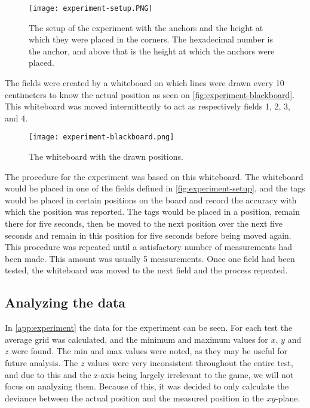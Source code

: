\begin{figure}[H]
    \centering
    \texttt{[image: experiment-setup.PNG]}
    \caption{The setup of the experiment with the anchors and the height at which they were placed in the corners. The hexadecimal number is the anchor, and above that is the height at which the anchors were placed.}
    \label{fig:experiment-setup}
\end{figure}
\noindent
The fields were created by a whiteboard on which lines were drawn every 10 centimeters to know the actual position as seen on \autoref{fig:experiment-blackboard}.
This whiteboard was moved intermittently to act as respectively fields 1, 2, 3, and 4.

\begin{figure}[H]
    \centering
    \texttt{[image: experiment-blackboard.png]}
    \caption{The whiteboard with the drawn positions.}
    \label{fig:experiment-blackboard}
\end{figure}
\noindent
The procedure for the experiment was based on this whiteboard.
The whiteboard would be placed in one of the fields defined in \autoref{fig:experiment-setup}, and the tags would be placed in certain positions on the board and record the accuracy with which the position was reported.
The tags would be placed in a position, remain there for five seconds, then be moved to the next position over the next five seconds and remain in this position for five seconds before being moved again.
This procedure was repeated until a satisfactory number of measurements had been made.
This amount was usually 5 measurements.
Once one field had been tested, the whiteboard was moved to the next field and the process repeated.

\subsection{Analyzing the data}
In \autoref{app:experiment} the data for the experiment can be seen.
For each test the average grid was calculated, and the minimum and maximum values for $x$, $y$ and $z$ were found.
The min and max values were noted, as they may be useful for future analysis.
The $z$ values were very inconsistent throughout the entire test, and due to this and the z-axis being largely irrelevant to the game, we will not focus on analyzing them.
Because of this, it was decided to only calculate the deviance between the actual position and the measured position in the $xy$-plane.

